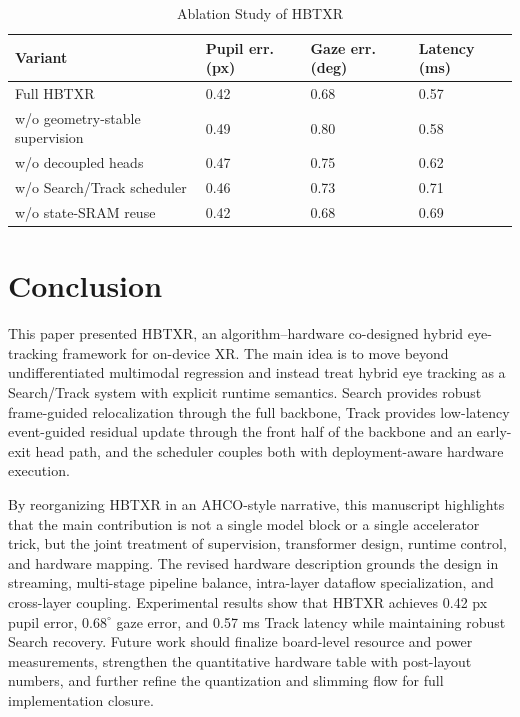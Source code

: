 \documentclass[journal]{IEEEtran}
\begin{document}
\begin{table}[t]
\caption{Ablation Study of HBTXR}
\label{tab:ablation}
\centering
\footnotesize
\begin{tabularx}{\columnwidth}{@{}L{0.48\columnwidth}C{0.14\columnwidth}C{0.14\columnwidth}C{0.14\columnwidth}@{}}
\toprule
Variant & Pupil err. (px) & Gaze err. (deg) & Latency (ms) \\
\midrule
Full HBTXR & 0.42 & 0.68 & 0.57 \\
w/o geometry-stable supervision & 0.49 & 0.80 & 0.58 \\
w/o decoupled heads & 0.47 & 0.75 & 0.62 \\
w/o Search/Track scheduler & 0.46 & 0.73 & 0.71 \\
w/o state-SRAM reuse & 0.42 & 0.68 & 0.69 \\
\bottomrule
\end{tabularx}
\end{table}

\section{Conclusion}

This paper presented HBTXR, an algorithm--hardware co-designed hybrid eye-tracking framework for on-device XR. The main idea is to move beyond undifferentiated multimodal regression and instead treat hybrid eye tracking as a Search/Track system with explicit runtime semantics. Search provides robust frame-guided relocalization through the full backbone, Track provides low-latency event-guided residual update through the front half of the backbone and an early-exit head path, and the scheduler couples both with deployment-aware hardware execution.

By reorganizing HBTXR in an AHCO-style narrative, this manuscript highlights that the main contribution is not a single model block or a single accelerator trick, but the joint treatment of supervision, transformer design, runtime control, and hardware mapping. The revised hardware description grounds the design in streaming, multi-stage pipeline balance, intra-layer dataflow specialization, and cross-layer coupling. Experimental results show that HBTXR achieves 0.42 px pupil error, $0.68^{\circ}$ gaze error, and 0.57 ms Track latency while maintaining robust Search recovery. Future work should finalize board-level resource and power measurements, strengthen the quantitative hardware table with post-layout numbers, and further refine the quantization and slimming flow for full implementation closure.
\end{document}

